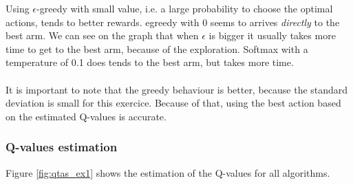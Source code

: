 \documentclass[letterpaper]{article}
\begin{document}
Using $\epsilon$-greedy with small
value, i.e. a large probability to choose the optimal actions,
tends
to better rewards. egreedy with 0 seems to arrives
\textit{directly} to the best arm. We can see on the graph that when $\epsilon$
is bigger it usually takes more time to get to the best arm, because of
the exploration.
Softmax with a temperature of 0.1 does tends to the best arm, but takes more
time.

\paragraph{}


It is important to note that the greedy behaviour is better, because
the standard deviation is small for this exercice. Because of that, using
the best action based on the estimated Q-values is accurate.

\subsubsection{Q-values estimation}

\label{sec:ex1_q_estim}

Figure \ref{fig:qtas_ex1} shows the estimation
of the Q-values for all algorithms.
\end{document}
